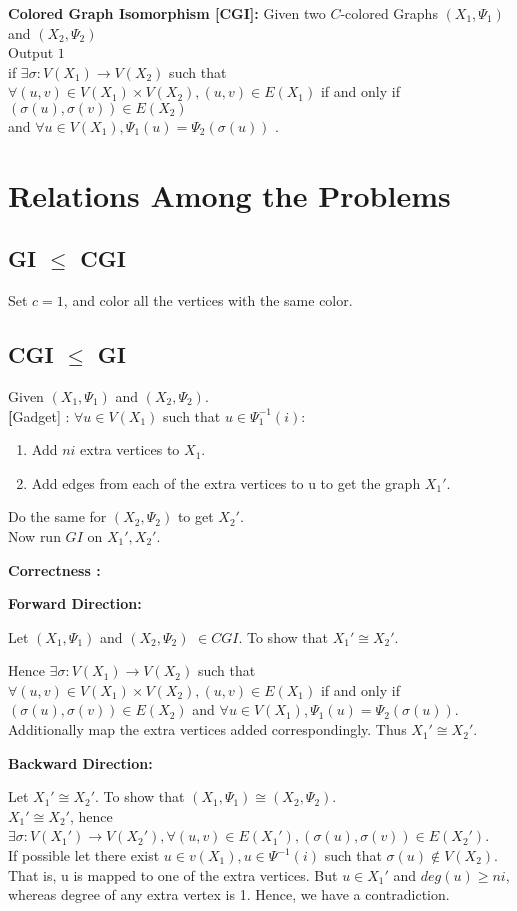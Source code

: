 \textbf{Colored Graph Isomorphism [CGI]:} Given two $C$-colored Graphs $(X_1,\Psi_1)$ and $(X_2,\Psi_2)$\\
Output $1$ \\
if $\exists \sigma : V(X_1) \rightarrow V(X_2)$ such that 
$\forall (u,v) \in V(X_1)\times V(X_2), (u,v) \in E(X_1)$ if and only if $(\sigma(u), \sigma(v)) \in E(X_2) $\\
 and $\forall u \in V(X_1) , \Psi_1(u) = \Psi_2(\sigma(u))$ .

\section{Relations Among the Problems}

\subsection{GI $\le$ CGI}
	Set $c=1$, and color all the vertices with the same color.

\subsection{CGI $\le$ GI}
Given $(X_1,\Psi_1)$ and $(X_2,\Psi_2)$.\\
\textbf[Gadget] : $\forall u \in V(X_1)$ such that $u \in \Psi_1^{-1}(i)$:
\begin{enumerate}
\item Add $ni$ extra vertices to $X_1$.
\item Add edges from each of the extra vertices to u to get the graph $X_1'$.
\end{enumerate}
Do the same for $(X_2,\Psi_2)$ to get $X_2'$.\\
Now run $GI$ on $X_1',X_2'$.

\textbf{Correctness :}

\textbf{Forward Direction:}

Let $(X_1,\Psi_1)$ and $(X_2,\Psi_2)$ $\in CGI$. To show that $X_1' \cong X_2'$.

Hence $\exists \sigma : V(X_1) \rightarrow V(X_2)$ such that 
$\forall (u,v) \in V(X_1)\times V(X_2), (u,v) \in E(X_1)$ 
if and only if $(\sigma(u), \sigma(v)) \in E(X_2) $ and $\forall u \in V(X_1) , \Psi_1(u) = \Psi_2(\sigma(u))$. Additionally map the extra vertices added correspondingly. Thus $X_1' \cong X_2'$.


\textbf{Backward Direction:}


Let $X_1' \cong X_2'$. To show that $(X_1,\Psi_1) \cong (X_2,\Psi_2)$.\\
$X_1' \cong X_2'$, hence $ \exists \sigma : V(X_1') \rightarrow V(X_2'), \forall (u,v) \in E(X_1'), (\sigma(u),\sigma(v)) \in E(X_2')$.\\
If possible let there exist $ u \in v(X_1), u \in \Psi^{-1}(i)$ such that $\sigma(u) \notin V(X_2)$. That is, u is mapped to one of the extra vertices. But $u \in X_1'$ and $deg(u) \ge ni$, whereas degree of any extra vertex is 1. Hence, we have a contradiction.

